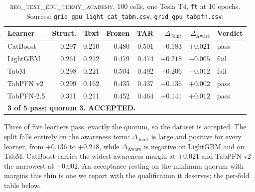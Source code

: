 \documentclass{article}
\newcommand{\djoint}{\Delta_{\text{Joint}}}
\newcommand{\daware}{\Delta_{\text{Aware}}}
\begin{document}
\begin{table}[H]
\centering\small
\caption{\textsc{reg\_text\_edu\_udemy\_academy}, 100 cells, one Tesla T4, \texttt{ft} at 10
epochs. Sources: \texttt{grid\_gpu\_light\_cat\_tabm.csv}, \texttt{grid\_gpu\_tabpfn.csv}.}
\begin{tabular}{lrrrrrrl}
\toprule
Learner & Struct. & Text & Frozen & TAR & $\djoint$ & $\daware$ & Verdict \\
\midrule
CatBoost   & 0.297 & 0.210 & 0.480 & 0.501 & $+0.183$ & $+0.021$ & pass \\
LightGBM   & 0.261 & 0.212 & 0.479 & 0.474 & $+0.218$ & $-0.005$ & fail \\
TabM       & 0.298 & 0.221 & 0.504 & 0.492 & $+0.206$ & $-0.012$ & fail \\
TabPFN v2  & 0.299 & 0.162 & 0.435 & 0.437 & $+0.136$ & $+0.002$ & pass \\
TabPFN-2.5 & 0.311 & 0.211 & 0.452 & 0.464 & $+0.141$ & $+0.012$ & pass \\
\midrule
\multicolumn{8}{l}{\textbf{3 of 5 pass; quorum 3. ACCEPTED.}} \\
\bottomrule
\end{tabular}
\end{table}

\noindent Three of five learners pass, exactly the quorum, so the dataset is accepted. The split falls
entirely on the awareness term: $\djoint$ is large and positive for every learner, from $+0.136$
to $+0.218$, while $\daware$ is negative on LightGBM and on TabM. CatBoost carries the widest
awareness margin at $+0.021$ and TabPFN v2 the narrowest at $+0.002$. An acceptance resting on
the minimum quorum with margins this thin is one we report with the qualification it deserves;
the per-fold table below.
\end{document}
